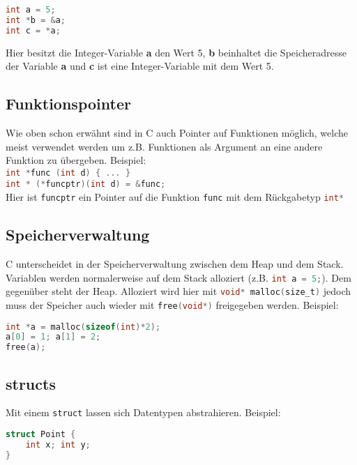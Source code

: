 \documentclass[11pt]{scrartcl}
\begin{document}
\begin{lstlisting}[language=C]
int a = 5;
int *b = &a;
int c = *a;
\end{lstlisting}

Hier besitzt die Integer-Variable \textbf a den Wert 5, \textbf b beinhaltet die Speicheradresse der Variable \textbf a und \textbf c ist eine Integer-Variable mit dem Wert 5.

\subsection{Funktionspointer}
Wie oben schon erwähnt sind in C auch Pointer auf Funktionen möglich, welche meist verwendet werden um z.B. Funktionen als Argument an eine andere Funktion zu übergeben. Beispiel:\\

\lstinline[language=C]!int *func (int d) { ... }!\\

\lstinline[language=C]!int * (*funcptr)(int d) = &func;! \\

Hier ist \lstinline[language=C]!funcptr! ein Pointer auf die Funktion \lstinline[language=C]!func! mit dem Rückgabetyp \lstinline[language=C]!int*!

\subsection{Speicherverwaltung}
C unterscheidet in der Speicherverwaltung zwischen dem Heap und dem Stack. Variablen werden normalerweise auf dem Stack alloziert (z.B. \lstinline[language=C]{int a = 5;}). Dem gegenüber steht der Heap. Alloziert wird hier mit \lstinline[language=C]{void* malloc(size_t)} jedoch muss der Speicher auch wieder mit \lstinline[language=C]{free(void*)} freigegeben werden. Beispiel:\\

\begin{lstlisting}[language=C]
int *a = malloc(sizeof(int)*2);
a[0] = 1; a[1] = 2;
free(a);
\end{lstlisting}

\subsection{structs}
Mit einem \texttt{struct} lassen sich Datentypen abstrahieren. Beispiel:\\

\begin{lstlisting}[language=C]
struct Point {
	int x; int y;
}
\end{lstlisting}
\end{document}
